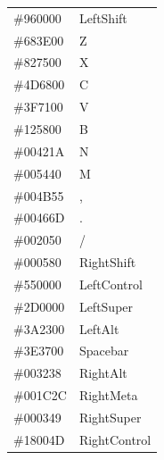 \documentclass{report}
\begin{document}
\begin{supertabular}{ll}
	\#960000 & LeftShift         \\
	\#683E00 & Z								 \\
	\#827500 & X								 \\
	\#4D6800 & C								 \\
	\#3F7100 & V								 \\
	\#125800 & B								 \\
	\#00421A & N								 \\
	\#005440 & M								 \\
	\#004B55 & ,								 \\
	\#00466D & .								 \\
	\#002050 & /								 \\
	\#000580 & RightShift				 \\

	\#550000 & LeftControl       \\
	\#2D0000 & LeftSuper         \\
	\#3A2300 & LeftAlt           \\
	\#3E3700 & Spacebar					 \\
	\#003238 & RightAlt					 \\
	\#001C2C & RightMeta 				 \\
	\#000349 & RightSuper				 \\
	\#18004D & RightControl 		 \\
\end{supertabular}

\onecolumn
\end{document}
